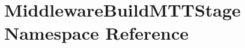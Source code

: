 \hypertarget{namespaceMiddlewareBuildMTTStage}{\section{Middleware\-Build\-M\-T\-T\-Stage Namespace Reference}
\label{namespaceMiddlewareBuildMTTStage}
}
